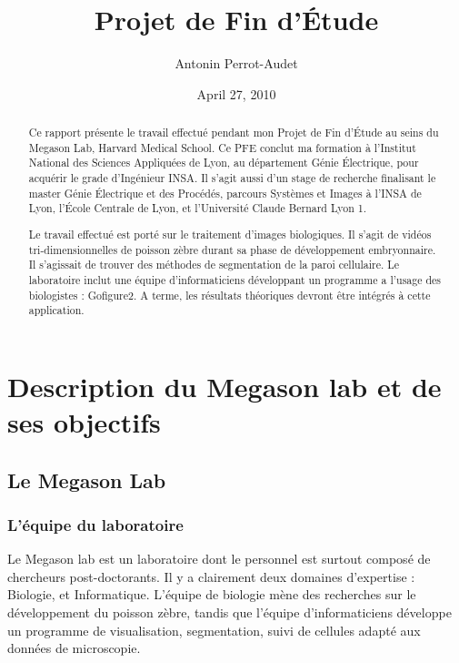 




\title{Projet de Fin d'Étude}   %
\author{Antonin Perrot-Audet}         %
\date{April 27, 2010}    %
\maketitle

\begin{abstract}
  Ce rapport présente le travail effectué pendant mon Projet de Fin d'Étude au seins du Megason Lab, Harvard Medical School. Ce PFE conclut ma formation à l'Institut National des Sciences Appliquées de Lyon, au département Génie Électrique, pour acquérir le grade d'Ingénieur INSA. Il s'agit aussi d'un stage de recherche finalisant le master Génie Électrique et des Procédés, parcours Systèmes et Images à l'INSA de Lyon, l'École Centrale de Lyon, et l'Université Claude Bernard Lyon 1.
  
  Le travail effectué est porté sur le traitement d'images biologiques. Il s'agit de vidéos tri-dimensionnelles de poisson zèbre durant sa phase de développement embryonnaire. Il s'agissait de trouver des méthodes de segmentation de la paroi cellulaire. Le laboratoire inclut une équipe d'informaticiens développant un programme a l'usage des biologistes : Gofigure2. A terme, les résultats théoriques devront être intégrés à cette application.
  
  
\tableofcontents  
  
 
\end{abstract}



\chapter{Description du Megason lab et de ses objectifs} 

\section{Le Megason Lab}

\subsection{L'équipe du laboratoire}
Le Megason lab est un laboratoire dont le personnel est surtout composé de chercheurs post-doctorants. Il y a clairement deux domaines d'expertise : Biologie, et Informatique. L'équipe de biologie mène des recherches sur le développement du poisson zèbre, tandis que l'équipe d'informaticiens développe un programme de visualisation, segmentation, suivi de cellules adapté aux données de microscopie.


